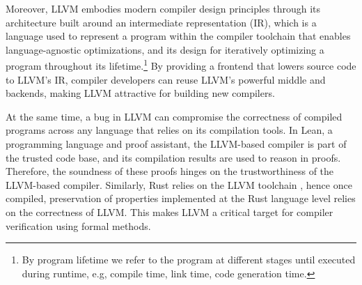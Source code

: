 \documentclass[review, anonymous, acmsmall, screen]{acmart}
\begin{document}
Moreover, LLVM embodies modern compiler design principles through its architecture built around an 
intermediate representation (IR), which is a language used to represent a program within the compiler 
toolchain that enables language-agnostic optimizations, and its design for iteratively optimizing a 
program throughout its lifetime.\footnote{By program lifetime we refer to the program at different stages
until executed during runtime, e.g, compile time, link time, code generation time.} By providing a frontend
that lowers source code to LLVM's IR, compiler developers can reuse LLVM's powerful middle and backends,
making LLVM attractive for building new compilers.

At the same time, a bug in LLVM can compromise the correctness of compiled programs across any language
that relies on its compilation tools. In Lean, a programming language and proof assistant, the LLVM-based
compiler is part of the trusted code base, and its compilation results are used to reason in proofs. 
Therefore, the soundness of these proofs hinges on the trustworthiness of the LLVM-based compiler. Similarly,
Rust relies on the LLVM toolchain , hence once compiled, preservation of properties 
implemented at the Rust language level relies on the correctness of LLVM. This makes LLVM a critical 
target for compiler verification using formal methods.
\end{document}
